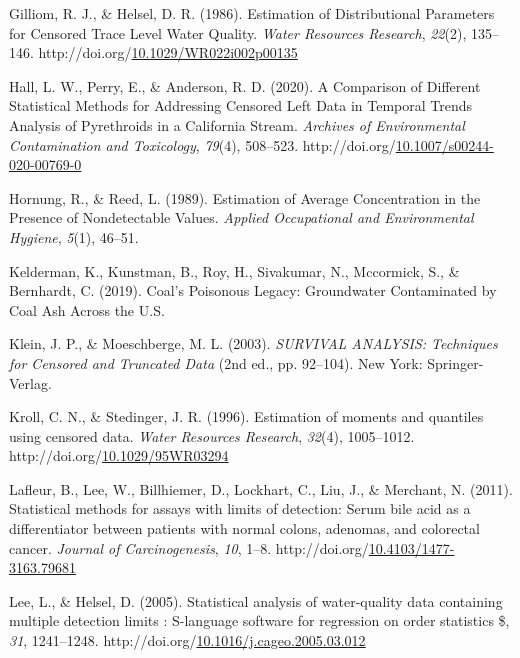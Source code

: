 \documentclass[12pt, twoside]{amherstthesis}
\newenvironment{CSLReferences}%
  {}%
  {\par}
\begin{document}
\begin{CSLReferences}{1}{0}
\leavevmode\hypertarget{ref-Gilliom1986}{}%
Gilliom, R. J., \& Helsel, D. R. (1986). {Estimation of Distributional Parameters for Censored Trace Level Water Quality}. \emph{Water Resources Research}, \emph{22}(2), 135--146. http://doi.org/\href{https://doi.org/10.1029/WR022i002p00135}{10.1029/WR022i002p00135}

\leavevmode\hypertarget{ref-Hall2020}{}%
Hall, L. W., Perry, E., \& Anderson, R. D. (2020). {A Comparison of Different Statistical Methods for Addressing Censored Left Data in Temporal Trends Analysis of Pyrethroids in a California Stream}. \emph{Archives of Environmental Contamination and Toxicology}, \emph{79}(4), 508--523. http://doi.org/\href{https://doi.org/10.1007/s00244-020-00769-0}{10.1007/s00244-020-00769-0}

\leavevmode\hypertarget{ref-Hornung1989}{}%
Hornung, R., \& Reed, L. (1989). {Estimation of Average Concentration in the Presence of Nondetectable Values}. \emph{Applied Occupational and Environmental Hygiene}, \emph{5}(1), 46--51.

\leavevmode\hypertarget{ref-Kelderman2019}{}%
Kelderman, K., Kunstman, B., Roy, H., Sivakumar, N., Mccormick, S., \& Bernhardt, C. (2019). {Coal's Poisonous Legacy: Groundwater Contaminated by Coal Ash Across the U.S.}

\leavevmode\hypertarget{ref-Klein2003}{}%
Klein, J. P., \& Moeschberge, M. L. (2003). \emph{{SURVIVAL ANALYSIS: Techniques for Censored and Truncated Data}} (2nd ed., pp. 92--104). New York: Springer-Verlag.

\leavevmode\hypertarget{ref-Kroll1996}{}%
Kroll, C. N., \& Stedinger, J. R. (1996). {Estimation of moments and quantiles using censored data}. \emph{Water Resources Research}, \emph{32}(4), 1005--1012. http://doi.org/\href{https://doi.org/10.1029/95WR03294}{10.1029/95WR03294}

\leavevmode\hypertarget{ref-Lafleur2011}{}%
Lafleur, B., Lee, W., Billhiemer, D., Lockhart, C., Liu, J., \& Merchant, N. (2011). {Statistical methods for assays with limits of detection: Serum bile acid as a differentiator between patients with normal colons, adenomas, and colorectal cancer}. \emph{Journal of Carcinogenesis}, \emph{10}, 1--8. http://doi.org/\href{https://doi.org/10.4103/1477-3163.79681}{10.4103/1477-3163.79681}

\leavevmode\hypertarget{ref-Lee2005}{}%
Lee, L., \& Helsel, D. (2005). {Statistical analysis of water-quality data containing multiple detection limits : S-language software for regression on order statistics {\$}}, \emph{31}, 1241--1248. http://doi.org/\href{https://doi.org/10.1016/j.cageo.2005.03.012}{10.1016/j.cageo.2005.03.012}


\end{CSLReferences}
\end{document}
